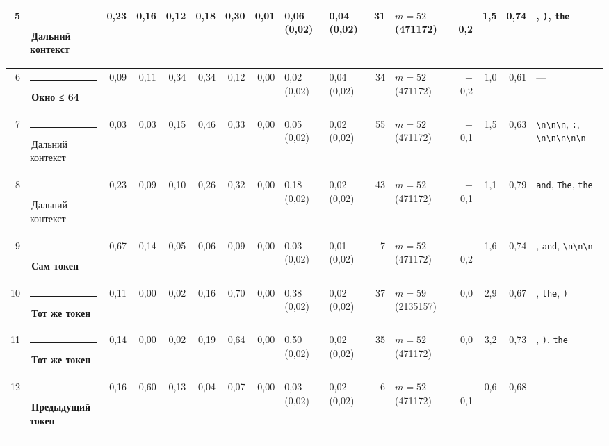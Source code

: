 \documentclass[10pt]{article}
\begin{document}
\begin{minipage}{\linewidth}
\begin{center}
{\begin{tabular}{|r|l|r|r|r|r|r|r|l|l|r|l|r|r|r|l|}
5 & \textcolor[HTML]{C3C2B7}{\rule{0.62em}{0.62em}}\,Дальний контекст & 0,23 & 0,16 & 0,12 & 0,18 & 0,30 & 0,01 & 0,06 (0,02) & 0,04 (0,02) & 31 & $m{=}52$ (471172) & $-$0,2 & 1,5 & 0,74 & \texttt{\textvisiblespace{}}, \texttt{\textvisiblespace{})}, \texttt{\textvisiblespace{}the} \\ \hline
6 & \textcolor[HTML]{EDA100}{\rule{0.62em}{0.62em}}\,\textbf{Окно ≤ 64} & 0,09 & 0,11 & 0,34 & 0,34 & 0,12 & 0,00 & 0,02 (0,02) & 0,04 (0,02) & 34 & $m{=}52$ (471172) & $-$0,2 & 1,0 & 0,61 & — \\ \hline
7 & \textcolor[HTML]{C3C2B7}{\rule{0.62em}{0.62em}}\,Дальний контекст & 0,03 & 0,03 & 0,15 & 0,46 & 0,33 & 0,00 & 0,05 (0,02) & 0,02 (0,02) & 55 & $m{=}52$ (471172) & $-$0,1 & 1,5 & 0,63 & \texttt{\textvisiblespace{}\textbackslash{}n\textbackslash{}n\textbackslash{}n}, \texttt{\textvisiblespace{}:}, \texttt{\textvisiblespace{}\textbackslash{}n\textbackslash{}n\textbackslash{}n\textbackslash{}n\textbackslash{}n} \\ \hline
8 & \textcolor[HTML]{C3C2B7}{\rule{0.62em}{0.62em}}\,Дальний контекст & 0,23 & 0,09 & 0,10 & 0,26 & 0,32 & 0,00 & 0,18 (0,02) & 0,02 (0,02) & 43 & $m{=}52$ (471172) & $-$0,1 & 1,1 & 0,79 & \texttt{\textvisiblespace{}and}, \texttt{\textvisiblespace{}The}, \texttt{\textvisiblespace{}the} \\ \hline
9 & \textcolor[HTML]{2A78D6}{\rule{0.62em}{0.62em}}\,\textbf{Сам токен} & 0,67 & 0,14 & 0,05 & 0,06 & 0,09 & 0,00 & 0,03 (0,02) & 0,01 (0,02) & 7 & $m{=}52$ (471172) & $-$0,2 & 1,6 & 0,74 & \texttt{\textvisiblespace{}}, \texttt{\textvisiblespace{}and}, \texttt{\textvisiblespace{}\textbackslash{}n\textbackslash{}n\textbackslash{}n} \\ \hline
10 & \textcolor[HTML]{E87BA4}{\rule{0.62em}{0.62em}}\,\textbf{Тот же токен} & 0,11 & 0,00 & 0,02 & 0,16 & 0,70 & 0,00 & 0,38 (0,02) & 0,02 (0,02) & 37 & $m{=}59$ (2135157) & 0,0 & 2,9 & 0,67 & \texttt{\textvisiblespace{}}, \texttt{\textvisiblespace{}the}, \texttt{\textvisiblespace{})} \\ \hline
11 & \textcolor[HTML]{E87BA4}{\rule{0.62em}{0.62em}}\,\textbf{Тот же токен} & 0,14 & 0,00 & 0,02 & 0,19 & 0,64 & 0,00 & 0,50 (0,02) & 0,02 (0,02) & 35 & $m{=}52$ (471172) & 0,0 & 3,2 & 0,73 & \texttt{\textvisiblespace{}}, \texttt{\textvisiblespace{})}, \texttt{\textvisiblespace{}the} \\ \hline
12 & \textcolor[HTML]{2A78D6}{\rule{0.62em}{0.62em}}\,\textbf{Предыдущий токен} & 0,16 & 0,60 & 0,13 & 0,04 & 0,07 & 0,00 & 0,03 (0,02) & 0,02 (0,02) & 6 & $m{=}52$ (471172) & $-$0,1 & 0,6 & 0,68 & — \\ \hline

\end{tabular}}
\end{center}
\end{minipage}
\end{document}
